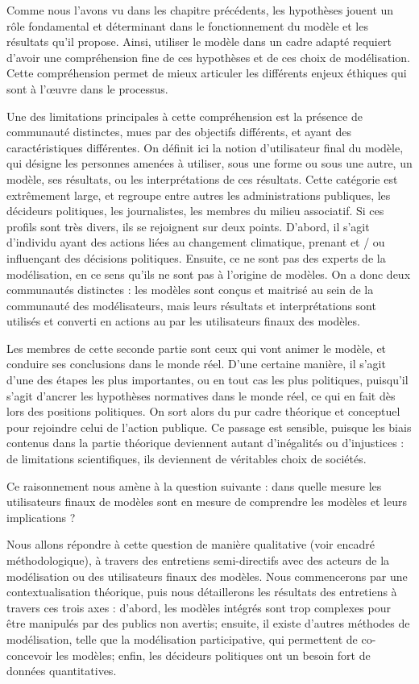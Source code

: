 Comme nous l'avons vu dans les chapitre précédents, les hypothèses jouent un rôle fondamental et déterminant dans le fonctionnement du modèle et les résultats qu'il propose. Ainsi, utiliser le modèle dans un cadre adapté requiert d'avoir une compréhension fine de ces hypothèses et de ces choix de modélisation. Cette compréhension permet de mieux articuler les différents enjeux éthiques qui sont à l'œuvre dans le processus. 

Une des limitations principales à cette compréhension est la présence de communauté distinctes, mues par des objectifs différents, et ayant des caractéristiques différentes. On définit ici la notion d'utilisateur final du modèle, qui désigne les personnes amenées à utiliser, sous une forme ou sous une autre, un modèle, ses résultats, ou les interprétations de ces résultats. Cette catégorie est extrêmement large, et regroupe entre autres les administrations publiques, les décideurs politiques, les journalistes, les membres du milieu associatif. Si ces profils sont très divers, ils se rejoignent sur deux points. D'abord, il s'agit d'individu ayant des actions liées au changement climatique, prenant et / ou influençant des décisions politiques. Ensuite, ce ne sont pas des experts de la modélisation, en ce sens qu'ils ne sont pas à l'origine de modèles. On a donc deux communautés distinctes : les modèles sont conçus et maitrisé au sein de la communauté des modélisateurs, mais leurs résultats et interprétations sont utilisés et converti en actions au par les utilisateurs finaux des modèles. 

Les membres de cette seconde partie sont ceux qui vont animer le modèle, et conduire ses conclusions dans le monde réel. D'une certaine manière, il s'agit d'une des étapes les plus importantes, ou en tout cas les plus politiques, puisqu'il s'agit d'ancrer les hypothèses normatives dans le monde réel, ce qui en fait dès lors des positions politiques. On sort alors du pur cadre théorique et conceptuel pour rejoindre celui de l'action publique. Ce passage est sensible, puisque les biais contenus dans la partie théorique deviennent autant d'inégalités ou d'injustices : de limitations scientifiques, ils deviennent de véritables choix de sociétés.

Ce raisonnement nous amène à la question suivante : dans quelle mesure les utilisateurs finaux de modèles sont en mesure de comprendre les modèles et leurs implications ? 

Nous allons répondre à cette question de manière qualitative (voir encadré méthodologique), à travers des entretiens semi-directifs avec des acteurs de la modélisation ou des utilisateurs finaux des modèles. Nous commencerons par une contextualisation théorique, puis nous détaillerons les résultats des entretiens à travers ces trois axes : d'abord, les modèles intégrés sont trop complexes pour être manipulés par des publics non avertis; ensuite, il existe d'autres méthodes de modélisation, telle que la modélisation participative, qui permettent de co-concevoir les modèles; enfin, les décideurs politiques ont un besoin fort de données quantitatives. 




